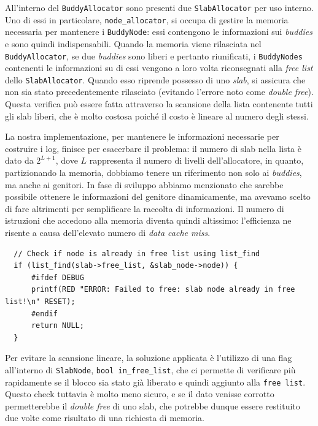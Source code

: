 All'interno del \texttt{BuddyAllocator} sono presenti due \texttt{SlabAllocator} per uso interno. Uno di essi in particolare, \texttt{node\_allocator}, si occupa di gestire la memoria necessaria per mantenere i \texttt{BuddyNode}: essi contengono le informazioni sui \textit{buddies} e sono quindi indispensabili. Quando la memoria viene rilasciata nel \texttt{BuddyAllocator}, se due \textit{buddies} sono liberi e pertanto riunificati, i \texttt{BuddyNodes} contenenti le informazioni su di essi vengono a loro volta riconsegnati alla \textit{free list} dello \texttt{SlabAllocator}. Quando esso riprende possesso di uno \textit{slab}, si assicura che non sia stato precedentemente rilasciato (evitando l'errore noto come \textit{double free}). Questa verifica può essere fatta attraverso la scansione della lista contenente tutti gli slab liberi, che è molto costosa poiché il costo è lineare al numero degli stessi. 

La nostra implementazione, per mantenere le informazioni necessarie per costruire i log, finisce per esacerbare il problema: il numero di slab nella lista è dato da $2^{L+1}$\footnotemark, dove $L$ rappresenta il numero di livelli dell'allocatore, in quanto, partizionando la memoria, dobbiamo tenere un riferimento non solo ai \textit{buddies}, ma anche ai genitori. In fase di sviluppo abbiamo menzionato che sarebbe possibile ottenere le informazioni del genitore dinamicamente, ma avevamo scelto di fare altrimenti per semplificare la raccolta di informazioni. Il numero di istruzioni che accedono alla memoria diventa quindi altissimo: l'efficienza ne risente a causa dell'elevato numero di \textit{data cache miss}.


\begin{lstlisting}
  // Check if node is already in free list using list_find
  if (list_find(slab->free_list, &slab_node->node)) {
      #ifdef DEBUG
      printf(RED "ERROR: Failed to free: slab node already in free list!\n" RESET);
      #endif
      return NULL;
  }
\end{lstlisting}

Per evitare la scansione lineare, la soluzione applicata è l'utilizzo di una flag all'interno di \texttt{SlabNode}, \texttt{bool in\_free\_list}, che ci permette di verificare più rapidamente se il blocco sia stato già liberato e quindi aggiunto alla \texttt{free list}. Questo check tuttavia è molto meno sicuro, e se il dato venisse corrotto permetterebbe il \textit{double free} di uno slab, che potrebbe dunque essere restituito due volte come risultato di una richiesta di memoria. 

